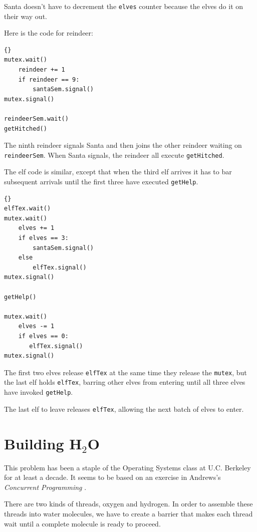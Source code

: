 \documentclass{book}
\begin{document}
Santa doesn't have to decrement
the {\tt elves} counter because the elves do it on their way
out.

Here is the code for reindeer:

\begin{lstlisting}[title={Santa problem solution (reindeer)}]{}
mutex.wait()
    reindeer += 1
    if reindeer == 9:
        santaSem.signal()
mutex.signal()

reindeerSem.wait()
getHitched()
\end{lstlisting}

The ninth reindeer signals Santa and then joins the other
reindeer waiting on {\tt reindeerSem}.  When Santa signals, the
reindeer all execute {\tt getHitched}.

The elf code is similar, except that when the third elf arrives
it has to bar subsequent arrivals until the first three have
executed {\tt getHelp}.

\newpage
\begin{lstlisting}[title={Santa problem solution (elves)}]{}
elfTex.wait()
mutex.wait()
    elves += 1
    if elves == 3:
        santaSem.signal()
    else
        elfTex.signal()
mutex.signal()

getHelp()

mutex.wait()
    elves -= 1
    if elves == 0:
       elfTex.signal()
mutex.signal()
\end{lstlisting}

The first two elves release {\tt elfTex} at the same time they release
the {\tt mutex}, but the last elf holds {\tt elfTex}, barring other
elves from entering until all three elves have invoked {\tt getHelp}.

The last elf to leave releases {\tt elfTex}, allowing the
next batch of elves to enter.

\newpage
\section{Building H$_2$O}
\label{water}

This problem has been a staple of the Operating Systems class
at U.C. Berkeley for at least a decade.  It seems to be based on
an exercise in Andrews's {\em Concurrent Programming} \cite{andrews}.

There are two kinds of threads, oxygen and hydrogen.  In order
to assemble these threads into water molecules, we have to
create a barrier that makes each thread wait until a
complete molecule is ready to proceed.
\end{document}

